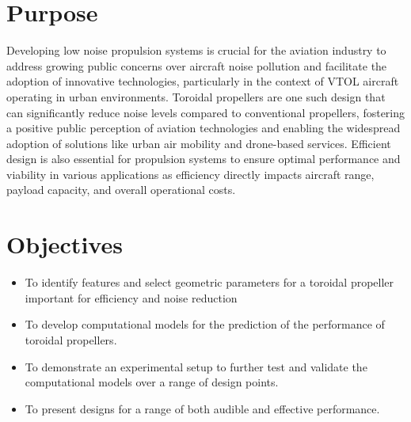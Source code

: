 \documentclass[a2,portrait]{a0poster}
\begin{document}
\begin{minipage}[t][0pt]{0.97\linewidth}
\begin{multicols}{2} %



\color{Navy}
\section*{Purpose}

Developing low noise propulsion systems is crucial for the aviation industry to address growing public concerns over aircraft noise pollution and facilitate the adoption of innovative technologies, particularly in the context of VTOL aircraft operating in urban environments. Toroidal propellers are one such design that can significantly reduce noise levels compared to conventional propellers, fostering a positive public perception of aviation technologies and enabling the widespread adoption of solutions like urban air mobility and drone-based services.
Efficient design is also essential for propulsion systems to ensure optimal performance and viability in various applications as efficiency directly impacts aircraft range, payload capacity, and overall operational costs.


\vfill\null
\columnbreak

\color{Navy} 
\section*{Objectives}

\begin{itemize}
\item To identify features and select geometric parameters for a toroidal propeller important for efficiency and noise reduction
\item To develop computational models for the prediction of the performance of toroidal propellers.
\item To demonstrate an experimental setup to further test and validate the computational models over a range of design points.
\item To present designs for a range of both audible and effective performance.
\end{itemize}


\end{multicols}
\end{minipage}
\end{document}
